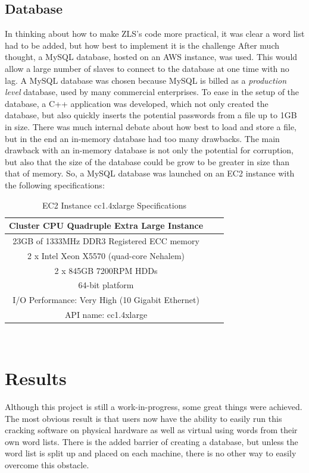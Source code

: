 \documentclass[12pt]{article}
\begin{document}
\subsection{Database}
\indent In thinking about how to make ZLS's code more practical, it was clear a word list had to be added, but how best to implement it is the challenge After much thought, a MySQL database, hosted on an AWS instance, was used. This would allow a large number of slaves to connect to the database at one time with no lag. A MySQL database was chosen because MySQL is billed as a \emph{production level} database, used by many commercial enterprises. To ease in the setup of the database, a C++ application was developed, which not only created the database, but also quickly inserts the potential passwords from a file up to 1GB in size. There was much internal debate about how best to load and store a file, but in the end an in-memory database had too many drawbacks. The main drawback with an in-memory database is not only the potential for corruption, but also that the size of the database could be grow to be greater in size than that of memory. So, a MySQL database was launched on an EC2 instance with the following specifications:\\
\begin{table}[htbp]
\begin{center}
\begin{tabular}{ |c|c|c| } %
 \hline
 \textbf{Cluster CPU Quadruple Extra Large Instance} \\ %
 \hline
 23GB of 1333MHz DDR3 Registered ECC memory\\ %
 \hline
2 x Intel Xeon X5570   (quad-core Nehalem)\\%
 \hline
2 x 845GB 7200RPM HDDs\\
\hline
64-bit platform\\
\hline
 I/O Performance: Very High (10 Gigabit Ethernet)\\
\hline
API name: cc1.4xlarge\\
\hline
 \end{tabular}
\end{center}
\caption{EC2 Instance cc1.4xlarge Specifications}
\end{table}
\\
\section{Results}
\indent Although this project is still a work-in-progress, some great things were achieved. The most obvious result is that users now have the ability to easily run this cracking software on physical hardware as well as virtual using words from their own word lists. There is the added barrier of creating a database, but unless the word list is split up and placed on each machine, there is no other way to easily overcome this obstacle.
\end{document}
